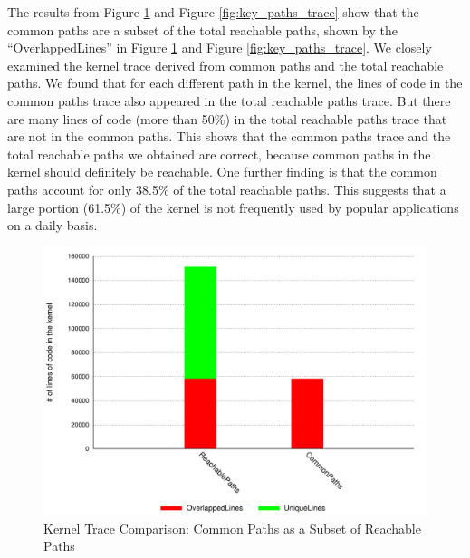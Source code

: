 The results from Figure \ref{fig:subset} and Figure
\ref{fig:key_paths_trace}  
show that the common paths are a subset of the
total reachable paths, 
shown by the ``OverlappedLines'' in Figure \ref{fig:subset} and Figure
\ref{fig:key_paths_trace}. 
We closely examined the kernel trace derived from common paths
and the total reachable paths. We found that for each different path
in the kernel, the lines of code 
in the common paths trace also appeared in the total reachable paths trace.
But there are many lines of code (more than 50\%) 
in the total reachable paths trace that are not in the common paths. This
shows that the common paths trace and 
the total reachable paths we obtained are correct, because common paths in
the kernel should definitely be reachable. 
One further finding is that the common paths account
for only 38.5\% of the total reachable paths. 
This suggests that a large portion (61.5\%) of the kernel is not frequently
used by popular applications on a daily basis.

\begin{figure}
\centering
\includegraphics[width=1.0\columnwidth]{diagram/lind_oakland16_diagram_01.pdf}
\caption{Kernel Trace Comparison: Common Paths as a Subset of Reachable
Paths}
\label{fig:subset}
\end{figure}

